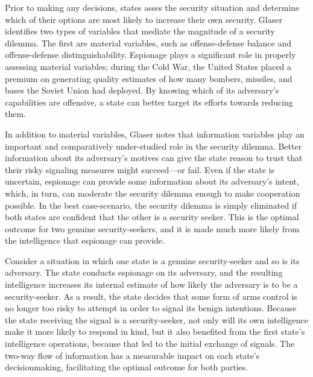\documentclass[14pt]{extarticle}
\begin{document}
Prior to making any decisions, states asses the security situation and determine which of their options are most likely to increase their own security. Glaser identifies two types of variables that mediate the magnitude of a security dilemma. The first are material variables, such as offense-defense balance and offense-defense distinguishability. Espionage plays a significant role in properly assessing material variables; during the Cold War, the United States placed a premium on generating quality estimates of how many bombers, missiles, and bases the Soviet Union had deployed. By knowing which of its adversary's capabilities are offensive, a state can better target its efforts towards reducing them.

In addition to material variables, Glaser notes that information variables play an important and comparatively under-studied role in the security dilemma. Better information about its adversary's motives can give the state reason to trust that their risky signaling measures might succeed---or fail. Even if the state is uncertain, espionage can provide some information about its adversary's intent, which, in turn, can moderate the security dilemma enough to make cooperation possible. In the best case-scenario, the security dilemma is simply eliminated if both states are confident that the other is a security seeker. This is the optimal outcome for two genuine security-seekers, and it is made much more likely from the intelligence that espionage can provide.

Consider a situation in which one state is a genuine security-seeker and so is its adversary. The state conducts espionage on its adversary, and the resulting intelligence increases its internal estimate of how likely the adversary is to be a security-seeker. As a result, the state decides that some form of arms control is no longer too risky to attempt in order to signal its benign intentions. Because the state receiving the signal is a security-seeker, not only will its own intelligence make it more likely to respond in kind, but it also benefited from the first state's intelligence operations, because that led to the initial exchange of signals. The two-way flow of information has a measurable impact on each state's decisionmaking, facilitating the optimal outcome for both parties.

\end{document}
